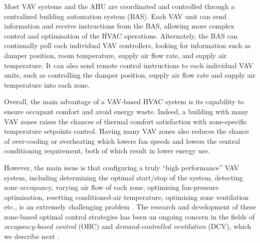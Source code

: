 
Most VAV systems and the AHU are coordinated and controlled through a centralized building automation system (BAS). Each VAV unit can send information and receive instructions from the BAS, allowing more complex control and optimisation of the HVAC operations. Alternately, the BAS can continually poll each individual VAV controllers, looking for information such as damper position, room temperature, supply air flow rate, and supply air temperature. It can also send remote control instructions to each individual VAV units, such as controlling the damper position, supply air flow rate and supply air temperature into each zone. 

Overall, the main advantage of a VAV-based HVAC system is its capability to ensure occupant comfort and avoid energy waste. Indeed, a building with many VAV zones raises the chances of thermal comfort satisfaction with zone-specific temperature setpoints control. Having many VAV zones also reduces the chance of over-cooling or overheating which lowers fan speeds and lowers the central conditioning requirement, both of which result in lower energy use. 

However, the main issue is that configuring a truly ``high performance'' VAV system, including determining the optimal start/stop of the system, detecting zone occupancy, varying air flow of each zone, optimising fan-pressure optimisation, resetting conditioned-air temperature, optimising zone ventilation etc., is an extremely challenging problem \citep{murphy2011high}. The research and development of these zone-based optimal control strategies has been an ongoing concern in the fields of \emph{\textsl{occupancy-based control}} (OBC) and \emph{\textsl{demand-controlled ventilation}} (DCV), which we describe next %
\citep{xu2009model,erickson2010occupancy,liu2012review,balaji2013zonepac,oldewurtel2013importance,goyal2013energy,goyal2013occupancy,zhang2013energy}.

